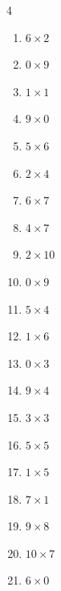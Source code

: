 \begin{multicols}{4}
\begin{enumerate}
  \item $6\times 2$
        \phantom{$=12$}

  \item $0\times 9$
        \phantom{$=0$}

  \item $1\times 1$
        \phantom{$=1$}

  \item $9\times 0$
        \phantom{$=0$}

  \item $5\times 6$
        \phantom{$=30$}

\columnbreak %

  \item $2\times 4$
        \phantom{$=8$}

  \item $6\times 7$
        \phantom{$=42$}

  \item $4\times 7$
        \phantom{$=28$}

  \item $2\times 10$
        \phantom{$=20$}

  \item $0\times 9$
        \phantom{$=0$}

  \item $5\times 4$
        \phantom{$=20$}

  \item $1\times 6$
        \phantom{$=6$}

  \item $0\times 3$
        \phantom{$=0$}

  \item $9\times 4$
        \phantom{$=36$}

  \item $3\times 3$
        \phantom{$=9$}

  \item $5\times 5$
        \phantom{$=25$}

  \item $1\times 5$
        \phantom{$=5$}

  \item $7\times 1$
        \phantom{$=7$}

  \item $9\times 8$
        \phantom{$=72$}

  \item $10\times 7$
        \phantom{$=70$}

  \item $6\times 0$
        \phantom{$=0$}


\end{enumerate}
\end{multicols}
